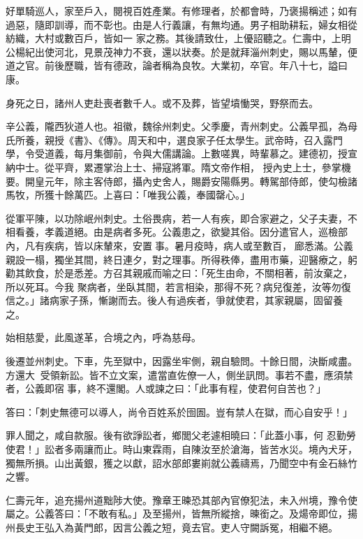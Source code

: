 \begin{pinyinscope}
 好單騎巡人，家至戶入，閱視百姓產業。有修理者，於都會時，乃褒揚稱述；如有過惡，隨即訓導，而不彰也。由是人行義讓，有無均通。男子相助耕耘，婦女相從紡織，大村或數百戶，皆如一
 家之務。其後請致仕，上優詔聽之。仁壽中，上明公楊紀出使河北，見景茂神力不衰，還以狀奏。於是就拜淄州刺史，賜以馬輦，便道之官。前後歷職，皆有德政，論者稱為良牧。大業初，卒官。年八十七，謚曰康。



 身死之日，諸州人吏赴喪者數千人。或不及葬，皆望墳慟哭，野祭而去。



 辛公義，隴西狄道人也。祖徽，魏徐州刺史。父季慶，青州刺史。公義早孤，為母氏所養，親授《書》、《傳》。周天和中，選良家子任太學生。武帝時，召入露門學，令受道義，每月集御前，令與大儒講論。上數嗟異，時輩慕之。建德初，授宣納中士。從平齊，累遷掌治上士、掃寇將軍。隋文帝作相，
 授內史上士，參掌機要。開皇元年，除主客侍郎，攝內史舍人，賜爵安陽縣男。轉駕部侍郎，使勾檢諸馬牧，所獲十餘萬匹。上喜曰：「唯我公義，奉國罄心。」



 從軍平陳，以功除岷州刺史。土俗畏病，若一人有疾，即合家避之，父子夫妻，不相看養，孝義道絕。由是病者多死。公義患之，欲變其俗。因分遣官人，巡檢部內，凡有疾病，皆以床輦來，安置事。暑月疫時，病人或至數百，廊悉滿。公義親設一榻，獨坐其間，終日連夕，對之理事。所得秩俸，盡用市藥，迎醫療之，躬勸其飲食，於是悉差。方召其親戚而喻之曰：「死生由命，不關相著，前汝棄之，所以死耳。今我
 聚病者，坐臥其間，若言相染，那得不死？病兒復差，汝等勿復信之。」諸病家子孫，慚謝而去。後人有過疾者，爭就使君，其家親屬，固留養之。



 始相慈愛，此風遂革，合境之內，呼為慈母。



 後遷並州刺史。下車，先至獄中，因露坐牢側，親自驗問。十餘日間，決斷咸盡。方還大，受領新訟。皆不立文案，遣當直佐僚一人，側坐訊問。事若不盡，應須禁者，公義即宿事，終不還閣。人或諫之曰：「此事有程，使君何自苦也？」



 答曰：「刺史無德可以導人，尚令百姓系於囹圄。豈有禁人在獄，而心自安乎！」



 罪人聞之，咸自款服。後有欲諍訟者，鄉閭父老遽相曉曰：「此蓋小事，何
 忍勤勞使君！」訟者多兩讓而止。時山東霖雨，自陳汝至於滄海，皆苦水災。境內犬牙，獨無所損。山出黃銀，獲之以獻，詔水部郎婁崱就公義禱焉，乃聞空中有金石絲竹之響。



 仁壽元年，追充揚州道黜陟大使。豫章王暕恐其部內官僚犯法，未入州境，豫令使屬之。公義答曰：「不敢有私。」及至揚州，皆無所縱捨，暕銜之。及煬帝即位，揚州長史王弘入為黃門郎，因言公義之短，竟去官。吏人守闕訴冤，相繼不絕。




\end{pinyinscope}
